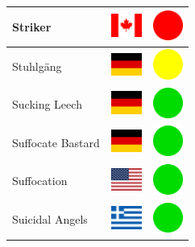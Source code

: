 \documentclass[12pt, a4paper, twoside]{report}
\begin{document}
\begin{center}
\begin{longtable}{|p{5cm}|p{2cm}|p{2cm}|}
 Striker                                                    & \includegraphics[width=1cm]{../img/flags/ca} &   \includegraphics[width=1cm]{../likes/n} \\ \hline
 Stuhlgäng                                                  & \includegraphics[width=1cm]{../img/flags/de} &   \includegraphics[width=1cm]{../likes/m} \\ \hline
 Sucking Leech                                              & \includegraphics[width=1cm]{../img/flags/de} &   \includegraphics[width=1cm]{../likes/y} \\ \hline
 Suffocate Bastard                                          & \includegraphics[width=1cm]{../img/flags/de} &   \includegraphics[width=1cm]{../likes/y} \\ \hline
 Suffocation                                                & \includegraphics[width=1cm]{../img/flags/us} &   \includegraphics[width=1cm]{../likes/y} \\ \hline
 Suicidal Angels                                            & \includegraphics[width=1cm]{../img/flags/gr} &   \includegraphics[width=1cm]{../likes/y} \\ \hline

\end{longtable}
\end{center}
\end{document}
